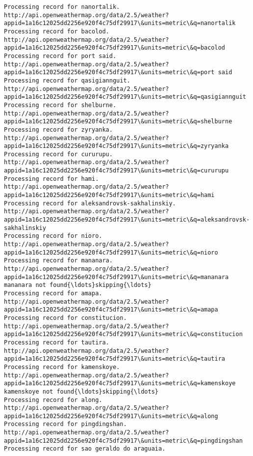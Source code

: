 \documentclass[11pt]{article}
\begin{document}
\begin{Verbatim}[commandchars=\\\{\}]
Processing record for nanortalik.
http://api.openweathermap.org/data/2.5/weather?appid=1a16c12025dd2256e920f4c75df29917\&units=metric\&q=nanortalik
Processing record for bacolod.
http://api.openweathermap.org/data/2.5/weather?appid=1a16c12025dd2256e920f4c75df29917\&units=metric\&q=bacolod
Processing record for port said.
http://api.openweathermap.org/data/2.5/weather?appid=1a16c12025dd2256e920f4c75df29917\&units=metric\&q=port said
Processing record for qasigiannguit.
http://api.openweathermap.org/data/2.5/weather?appid=1a16c12025dd2256e920f4c75df29917\&units=metric\&q=qasigiannguit
Processing record for shelburne.
http://api.openweathermap.org/data/2.5/weather?appid=1a16c12025dd2256e920f4c75df29917\&units=metric\&q=shelburne
Processing record for zyryanka.
http://api.openweathermap.org/data/2.5/weather?appid=1a16c12025dd2256e920f4c75df29917\&units=metric\&q=zyryanka
Processing record for cururupu.
http://api.openweathermap.org/data/2.5/weather?appid=1a16c12025dd2256e920f4c75df29917\&units=metric\&q=cururupu
Processing record for hami.
http://api.openweathermap.org/data/2.5/weather?appid=1a16c12025dd2256e920f4c75df29917\&units=metric\&q=hami
Processing record for aleksandrovsk-sakhalinskiy.
http://api.openweathermap.org/data/2.5/weather?appid=1a16c12025dd2256e920f4c75df29917\&units=metric\&q=aleksandrovsk-sakhalinskiy
Processing record for nioro.
http://api.openweathermap.org/data/2.5/weather?appid=1a16c12025dd2256e920f4c75df29917\&units=metric\&q=nioro
Processing record for mananara.
http://api.openweathermap.org/data/2.5/weather?appid=1a16c12025dd2256e920f4c75df29917\&units=metric\&q=mananara
mananara not found{\ldots}skipping{\ldots}
Processing record for amapa.
http://api.openweathermap.org/data/2.5/weather?appid=1a16c12025dd2256e920f4c75df29917\&units=metric\&q=amapa
Processing record for constitucion.
http://api.openweathermap.org/data/2.5/weather?appid=1a16c12025dd2256e920f4c75df29917\&units=metric\&q=constitucion
Processing record for tautira.
http://api.openweathermap.org/data/2.5/weather?appid=1a16c12025dd2256e920f4c75df29917\&units=metric\&q=tautira
Processing record for kamenskoye.
http://api.openweathermap.org/data/2.5/weather?appid=1a16c12025dd2256e920f4c75df29917\&units=metric\&q=kamenskoye
kamenskoye not found{\ldots}skipping{\ldots}
Processing record for along.
http://api.openweathermap.org/data/2.5/weather?appid=1a16c12025dd2256e920f4c75df29917\&units=metric\&q=along
Processing record for pingdingshan.
http://api.openweathermap.org/data/2.5/weather?appid=1a16c12025dd2256e920f4c75df29917\&units=metric\&q=pingdingshan
Processing record for sao geraldo do araguaia.

\end{Verbatim}
\end{document}
